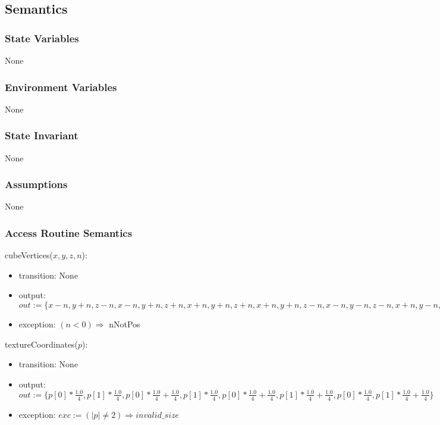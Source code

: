 \documentclass[12pt]{article}
\begin{document}
\subsection* {Semantics}

\subsubsection* {State Variables}

None

\subsubsection* {Environment Variables}

None

\subsubsection* {State Invariant}

None

\subsubsection* {Assumptions}

None

\subsubsection* {Access Routine Semantics}

cubeVertices($x, y, z, n$):
\begin{itemize}
\item transition: None
\item output: $\mathit{out} := \{ x-n,y+n,z-n, x-n,y+n,z+n, x+n,y+n,z+n, x+n,y+n,z-n, x-n,y-n,z-n, x+n,y-n,z-n, x+n,y-n,z+n, x-n,y-n,z+n, x-n,y-n,z-n, x-n,y-n,z+n, x-n,y+n,z+n, x-n,y+n,z-n, x+n,y-n,z+n, x+n,y-n,z-n, x+n,y+n,z-n, x+n,y+n,z+n, x-n,y-n,z+n, x+n,y-n,z+n, x+n,y+n,z+n, x-n,y+n,z+n, x+n,y-n,z-n, x-n,y-n,z-n, x-n,y+n,z-n, x+n,y+n,z-n \}$
        
\item exception: $ (n < 0) \Rightarrow $ nNotPos\\
\end{itemize}

\noindent textureCoordinates($p$):
\begin{itemize}
\item transition: None
\item output: $out := \{ p[0] * \frac{1.0}{4}, p[1] * \frac{1.0}{4}, p[0] * \frac{1.0}{4} + \frac{1.0}{4}, p[1] * \frac{1.0}{4}, p[0] * \frac{1.0}{4} + \frac{1.0}{4}, p[1] * \frac{1.0}{4} + \frac{1.0}{4}, p[0] * \frac{1.0}{4}, p[1] * \frac{1.0}{4} + \frac{1.0}{4} \}$
\item exception: $ exc := (|p| \neq 2) \Rightarrow invalid\_size $\\
\end{itemize}
\end{document}
